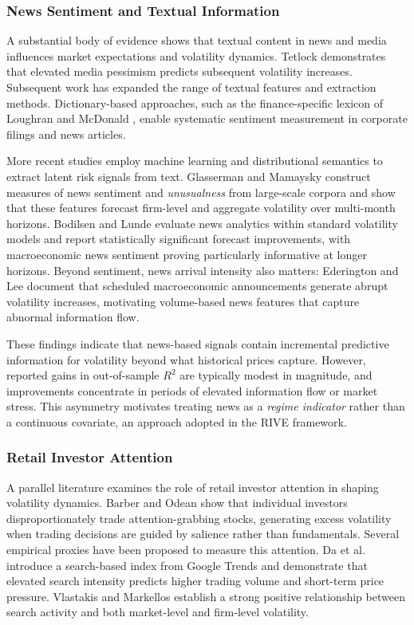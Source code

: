 \documentclass[review]{elsarticle}
\begin{document}
\subsubsection{News Sentiment and Textual Information}\label{news-sentiment}

A substantial body of evidence shows that textual content in news and media influences market expectations and volatility dynamics. Tetlock \cite{tetlock2007} demonstrates that elevated media pessimism predicts subsequent volatility increases. Subsequent work has expanded the range of textual features and extraction methods. Dictionary-based approaches, such as the finance-specific lexicon of Loughran and McDonald \cite{loughran2011}, enable systematic sentiment measurement in corporate filings and news articles.

More recent studies employ machine learning and distributional semantics to extract latent risk signals from text. Glasserman and Mamaysky \cite{glasserman2019} construct measures of news sentiment and \textit{unusualness} from large-scale corpora and show that these features forecast firm-level and aggregate volatility over multi-month horizons. Bodilsen and Lunde \cite{bodilsen2025} evaluate news analytics within standard volatility models and report statistically significant forecast improvements, with macroeconomic news sentiment proving particularly informative at longer horizons. Beyond sentiment, news arrival intensity also matters: Ederington and Lee \cite{ederington1993} document that scheduled macroeconomic announcements generate abrupt volatility increases, motivating volume-based news features that capture abnormal information flow.

These findings indicate that news-based signals contain incremental predictive information for volatility beyond what historical prices capture. However, reported gains in out-of-sample $R^2$ are typically modest in magnitude, and improvements concentrate in periods of elevated information flow or market stress. This asymmetry motivates treating news as a \textit{regime indicator} rather than a continuous covariate, an approach adopted in the RIVE framework.

\subsubsection{Retail Investor Attention}\label{retail-attention}

A parallel literature examines the role of retail investor attention in shaping volatility dynamics. Barber and Odean \cite{barber2008} show that individual investors disproportionately trade attention-grabbing stocks, generating excess volatility when trading decisions are guided by salience rather than fundamentals. Several empirical proxies have been proposed to measure this attention. Da et al.~\cite{da2011} introduce a search-based index from Google Trends and demonstrate that elevated search intensity predicts higher trading volume and short-term price pressure. Vlastakis and Markellos \cite{vlastakis2012} establish a strong positive relationship between search activity and both market-level and firm-level volatility.
\end{document}
